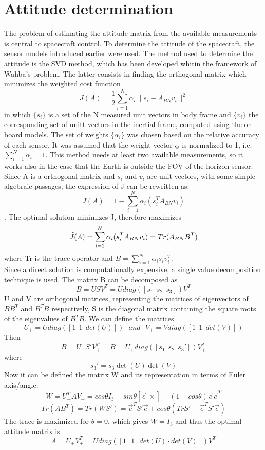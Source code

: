 \section{Attitude determination}
\label{subsec:attitude_det}

The problem of estimating the attitude matrix from the available measurements is central to spacecraft control. To determine the attitude of the spacecraft, the sensor models introduced earlier were used. The method used to determine the attitude is the SVD method, which has been developed whitin the framework of Wahba's problem. The latter consists in finding the orthogonal matrix which  minimizes the weighted cost function
$$J(A)=\frac{1}{2}\sum_{i=1}^N\alpha_i\lVert s_i - A_{BN}v_i \rVert^2$$
in which   $\{s_i\}$ is a set of the N measured unit vectors in body frame and $\{v_i\}$ the corresponding set of unitt vectors in the inertial frame, computed using the on-board models. The set of weights $\{\alpha_i\}$ was chosen based on the relative accuracy of each sensor. It was assumed that the weight vector $\underline{\alpha}$ is normalized to 1, i.e. $\sum_{i=1}^N\alpha_i=1$. This method needs at least two available measurements, so it works also in the case that the Earth is outside the FOV of the horizon sensor. \\
Since A is a orthogonal matrix and $s_i$ and $v_i$ are unit vectors, with some simple algebraic passages, the expression of J can be rewritten as: 
$$J(A)=1-\sum_{i=1}^N\alpha_i(s_i^TA_{BN}v_i)$$.
The optimal solution minimizes J, therefore maximizes $$\Tilde{J}(A)=\sum_{i=1}^N\alpha_i(s_i^TA_{BN}v_i)=Tr(A_{BN}B^T)$$ 
where Tr is the trace operator and $B=\sum_{i=1}^N\alpha_is_iv_i^T$.\\
Since a direct solution is computationally expensive, a single value decomposition technique is used. The matrix B can be decomposed as\\
$$B=USV^T=Udiag([s_1 \ \ s_2 \ \ s_3])V^T$$
U and V are orthogonal matrices, representing the matrices of eigenvectors of $BB^T$ and $B^TB$ respectively, S is the diagonal matrix containing the square roots of the eigenvalues of $B^TB$. We can define the matrices
$$U_{+}=Udiag([1 \ \ 1 \ \ det(U)]) \ \ \ and \ \ \ V_{+}=Vdiag([1 \ \ 1 \ \ det(V)])$$
Then 
$$B=U_{+}S'V_{+}^T=B=U_{+}diag([s_1 \ \ s_2 \ \ s_3'])V_{+}^T$$
where $$s_3'=s_3\det(U)\det(V)$$
Now it can be defined the matrix W and its representation in terms of Euler axis/angle:
$$W=U_{+}^TAV_{+}=cos\theta I_3 -sin\theta[\vec{e}\  \times]+(1-cos\theta) \vec{e}\vec{e}^T$$
$$Tr(AB^T)=Tr(WS')=\vec{e}^TS'\vec{e} + cos\theta(TrS'-\vec{e}^TS'\vec{e})$$
The trace is maximized for $\theta=0$, which gives $W=I_3$ and thus the optimal attitude matrix is
$$A=U_{+}V_{+}^T=Udiag([1 \  \ \ 1 \ \ \ det(U)\cdot{}det(V)])V^T$$